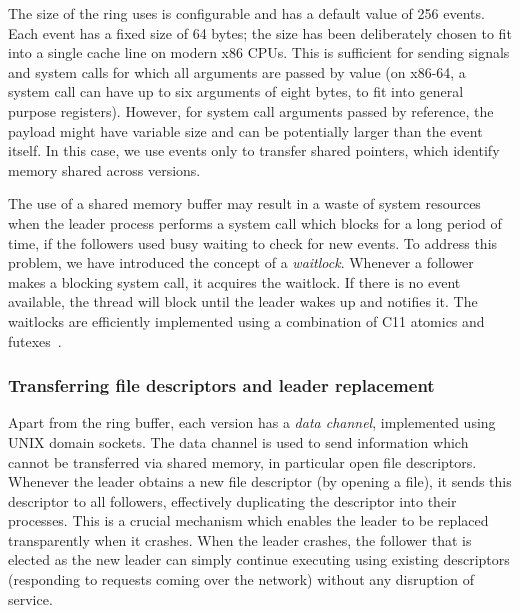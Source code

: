 The size of the ring \varan uses is configurable and has a default
value of 256 events.  Each event has a fixed size of 64 bytes; the
size has been deliberately chosen to fit into a single cache line on
modern x86 CPUs.  This is sufficient for sending signals and system
calls for which all arguments are passed by value (on x86-64, a system
call can have up to six arguments of eight bytes, to fit into general
purpose registers).  However, for system call arguments passed by
reference, the payload might have variable size and can be potentially
larger than the event itself.  In this case, we use events only to
transfer shared pointers, which identify memory shared across
versions.

The use of a shared memory buffer may result in a waste of system
resources when the leader process performs a system call which blocks
for a long period of time, if the followers used busy waiting to check
for new events. To address this problem, we have introduced the
concept of a \emph{waitlock}. Whenever a follower makes a blocking
system call, it acquires the waitlock. If there is no event available,
the thread will block until the leader wakes up and notifies it. The
waitlocks are efficiently implemented using a combination of C11
atomics and futexes~\cite{futex}.

\subsubsection{Transferring file descriptors and leader replacement}
\label{sec:leader-repl}

Apart from the ring buffer, each version has a \textit{data channel},
implemented using UNIX domain sockets.
The data channel is used to send information which cannot be
transferred via shared memory, in particular open file descriptors.
Whenever the leader obtains a new file descriptor (\eg by opening a
file), it sends this descriptor to all followers, effectively
duplicating the descriptor into their processes. This is a crucial
mechanism which enables the leader to be replaced transparently when
it crashes. When the leader crashes, the follower that is elected as
the new leader can simply continue executing using existing
descriptors (\eg responding to requests coming over the network)
without any disruption of service.

